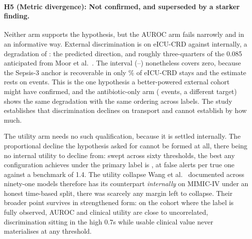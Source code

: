 \paragraph{H5 (Metric divergence): Not confirmed, and superseded by a starker
finding.}
Neither arm supports the hypothesis, but the AUROC arm fails narrowly and in an
informative way. External discrimination is \pcExtAurocPrimaryB{} on eICU-CRD
against \pcAurocPrimaryB{} internally, a degradation of \pcHFiveEst{}: the
predicted direction, and roughly three-quarters of the 0.085 anticipated from
Moor et al.\ \cite{moor2023review}. The interval (\pcHFiveCiLo--\pcHFiveCiHi)
nonetheless covers zero, because the Sepsis-3 anchor is recoverable in only
\pcExtMicroCoverage\% of eICU-CRD stays and the estimate rests on
\pcExtNEventsB{} events. This is the one hypothesis a better-powered external
cohort might have confirmed, and the antibiotic-only arm (\pcExtAbxNEventsB{}
events, a different target) shows the same degradation with the same ordering
across labels. The study establishes that discrimination declines on transport
and cannot establish by how much.

The utility arm needs no such qualification, because it is settled internally.
The proportional decline the hypothesis asked for cannot be formed at all,
there being no internal utility to decline from: swept across sixty thresholds,
the best any configuration achieves under the primary label is
\pcUtilityMaxGbtB{}, at \pcUtilityOptBurdenGbtB{} false alerts per true one
against a benchmark of 1.4. The utility collapse Wang et al.\
\cite{wang2025srpm} documented across ninety-one models therefore has its
counterpart \emph{internally} on MIMIC-IV under an honest time-based split,
there was scarcely any margin left to collapse. Their broader point survives in
strengthened form: on the cohort where the label is fully observed, AUROC and
clinical utility are close to uncorrelated, discrimination sitting in the high
0.7s while usable clinical value never materialises at any threshold.

